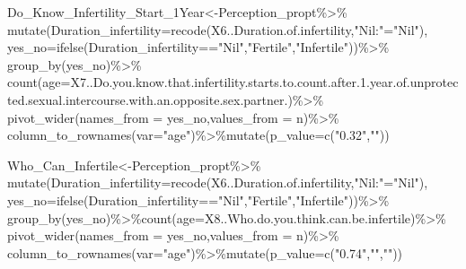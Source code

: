 \documentclass[
]{article}
\newenvironment{Shaded}{\begin{snugshade}}{\end{snugshade}}
\newcommand{\AttributeTok}[1]{\textcolor[rgb]{0.77,0.63,0.00}{#1}}
\newcommand{\FloatTok}[1]{\textcolor[rgb]{0.00,0.00,0.81}{#1}}
\newcommand{\FunctionTok}[1]{\textcolor[rgb]{0.00,0.00,0.00}{#1}}
\newcommand{\NormalTok}[1]{#1}
\newcommand{\OtherTok}[1]{\textcolor[rgb]{0.56,0.35,0.01}{#1}}
\newcommand{\SpecialCharTok}[1]{\textcolor[rgb]{0.00,0.00,0.00}{#1}}
\newcommand{\StringTok}[1]{\textcolor[rgb]{0.31,0.60,0.02}{#1}}
\begin{document}
\begin{Shaded}
\begin{Highlighting}[]
\NormalTok{Do\_Know\_Infertility\_Start\_1Year}\OtherTok{\textless{}{-}}\NormalTok{Perception\_propt}\SpecialCharTok{\%\textgreater{}\%}
  \FunctionTok{mutate}\NormalTok{(}\AttributeTok{Duration\_infertility=}\FunctionTok{recode}\NormalTok{(X6..Duration.of.infertility,}\StringTok{"Nil:"}\OtherTok{=}\StringTok{"Nil"}\NormalTok{),}
  \AttributeTok{yes\_no=}\FunctionTok{ifelse}\NormalTok{(Duration\_infertility}\SpecialCharTok{==}\StringTok{"Nil"}\NormalTok{,}\StringTok{"Fertile"}\NormalTok{,}\StringTok{"Infertile"}\NormalTok{))}\SpecialCharTok{\%\textgreater{}\%}
  \FunctionTok{group\_by}\NormalTok{(yes\_no)}\SpecialCharTok{\%\textgreater{}\%}
  \FunctionTok{count}\NormalTok{(}\AttributeTok{age=}\NormalTok{X7..Do.you.know.that.infertility.starts.to.count.after.}\FloatTok{1.}\NormalTok{year.of.unprotected.sexual.intercourse.with.an.opposite.sex.partner.)}\SpecialCharTok{\%\textgreater{}\%}
  \FunctionTok{pivot\_wider}\NormalTok{(}\AttributeTok{names\_from =}\NormalTok{ yes\_no,}\AttributeTok{values\_from =}\NormalTok{ n)}\SpecialCharTok{\%\textgreater{}\%}
  \FunctionTok{column\_to\_rownames}\NormalTok{(}\AttributeTok{var=}\StringTok{"age"}\NormalTok{)}\SpecialCharTok{\%\textgreater{}\%}\FunctionTok{mutate}\NormalTok{(}\AttributeTok{p\_value=}\FunctionTok{c}\NormalTok{(}\StringTok{"0.32"}\NormalTok{,}\StringTok{""}\NormalTok{))}

\NormalTok{Who\_Can\_Infertile}\OtherTok{\textless{}{-}}\NormalTok{Perception\_propt}\SpecialCharTok{\%\textgreater{}\%}
  \FunctionTok{mutate}\NormalTok{(}\AttributeTok{Duration\_infertility=}\FunctionTok{recode}\NormalTok{(X6..Duration.of.infertility,}\StringTok{"Nil:"}\OtherTok{=}\StringTok{"Nil"}\NormalTok{),}
  \AttributeTok{yes\_no=}\FunctionTok{ifelse}\NormalTok{(Duration\_infertility}\SpecialCharTok{==}\StringTok{"Nil"}\NormalTok{,}\StringTok{"Fertile"}\NormalTok{,}\StringTok{"Infertile"}\NormalTok{))}\SpecialCharTok{\%\textgreater{}\%}
  \FunctionTok{group\_by}\NormalTok{(yes\_no)}\SpecialCharTok{\%\textgreater{}\%}\FunctionTok{count}\NormalTok{(}\AttributeTok{age=}\NormalTok{X8..Who.do.you.think.can.be.infertile)}\SpecialCharTok{\%\textgreater{}\%}
  \FunctionTok{pivot\_wider}\NormalTok{(}\AttributeTok{names\_from =}\NormalTok{ yes\_no,}\AttributeTok{values\_from =}\NormalTok{ n)}\SpecialCharTok{\%\textgreater{}\%}
  \FunctionTok{column\_to\_rownames}\NormalTok{(}\AttributeTok{var=}\StringTok{"age"}\NormalTok{)}\SpecialCharTok{\%\textgreater{}\%}\FunctionTok{mutate}\NormalTok{(}\AttributeTok{p\_value=}\FunctionTok{c}\NormalTok{(}\StringTok{"0.74"}\NormalTok{,}\StringTok{""}\NormalTok{,}\StringTok{""}\NormalTok{))}


\end{Highlighting}
\end{Shaded}
\end{document}
